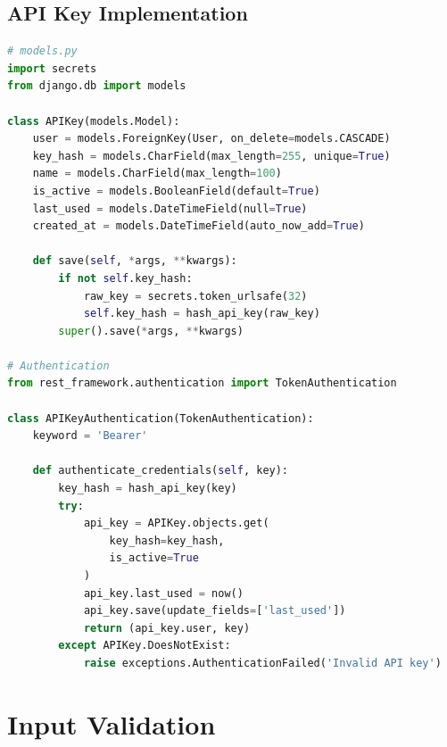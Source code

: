 \documentclass{report}
\begin{document}
\subsection{API Key Implementation}
\begin{lstlisting}[language=Python]
# models.py
import secrets
from django.db import models

class APIKey(models.Model):
    user = models.ForeignKey(User, on_delete=models.CASCADE)
    key_hash = models.CharField(max_length=255, unique=True)
    name = models.CharField(max_length=100)
    is_active = models.BooleanField(default=True)
    last_used = models.DateTimeField(null=True)
    created_at = models.DateTimeField(auto_now_add=True)
    
    def save(self, *args, **kwargs):
        if not self.key_hash:
            raw_key = secrets.token_urlsafe(32)
            self.key_hash = hash_api_key(raw_key)
        super().save(*args, **kwargs)

# Authentication
from rest_framework.authentication import TokenAuthentication

class APIKeyAuthentication(TokenAuthentication):
    keyword = 'Bearer'
    
    def authenticate_credentials(self, key):
        key_hash = hash_api_key(key)
        try:
            api_key = APIKey.objects.get(
                key_hash=key_hash,
                is_active=True
            )
            api_key.last_used = now()
            api_key.save(update_fields=['last_used'])
            return (api_key.user, key)
        except APIKey.DoesNotExist:
            raise exceptions.AuthenticationFailed('Invalid API key')
\end{lstlisting}

\section{Input Validation}
\end{document}
